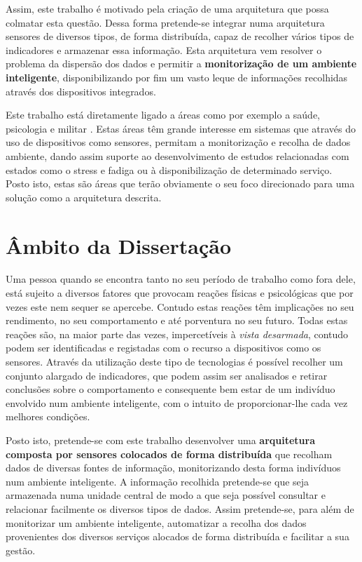 Assim, este trabalho é motivado pela criação de uma arquitetura que possa colmatar esta questão. Dessa forma pretende-se integrar numa arquitetura sensores de diversos tipos, de forma distribuída, capaz de recolher vários tipos de indicadores e armazenar essa informação. Esta arquitetura vem resolver o problema da dispersão dos dados e permitir a \textbf{monitorização de um ambiente inteligente}, disponibilizando por fim um vasto leque de informações recolhidas através dos dispositivos integrados.

Este trabalho está diretamente ligado a áreas como por exemplo a saúde, psicologia e militar \cite{akyildiz2002wireless, aarts2006into}. Estas áreas têm grande interesse em sistemas que através do uso de dispositivos como sensores, permitam a monitorização e recolha de dados ambiente, dando assim suporte ao desenvolvimento de estudos relacionadas com estados como o stress e fadiga ou à disponibilização de determinado serviço. Posto isto, estas são áreas que terão obviamente o seu foco direcionado para uma solução como a arquitetura descrita.


\section{Âmbito da Dissertação}
Uma pessoa quando se encontra tanto no seu período de trabalho como fora dele, está sujeito a diversos fatores que provocam reações físicas e psicológicas que por vezes este nem sequer se apercebe. Contudo estas reações têm implicações no seu rendimento, no seu comportamento e até porventura no seu futuro. Todas estas reações são, na maior parte das vezes, impercetíveis à \textit{vista desarmada}, contudo podem ser identificadas e registadas com o recurso a dispositivos como os sensores. Através da utilização deste tipo de tecnologias é possível recolher um conjunto alargado de indicadores, que podem assim ser analisados e retirar conclusões sobre o comportamento e consequente bem estar de um indivíduo envolvido num ambiente inteligente, com o intuito de proporcionar-lhe cada vez melhores condições.

Posto isto, pretende-se com este trabalho desenvolver uma \textbf{arquitetura composta por sensores colocados de forma distribuída} que recolham dados de diversas fontes de informação, monitorizando desta forma indivíduos num ambiente inteligente. A informação recolhida pretende-se que seja armazenada numa unidade central de modo a que seja possível consultar e relacionar facilmente os diversos tipos de dados. Assim pretende-se, para além de monitorizar um ambiente inteligente, automatizar a recolha dos dados provenientes dos diversos serviços alocados de forma distribuída e facilitar a sua gestão.



